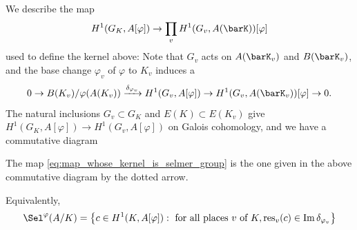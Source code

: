 \begin{definition}
    We describe the map 
    \begin{equation} \label{eq:map_whose_kernel_is_selmer_group}
    H^1(G_K, A[\varphi]) \to \prod_v H^1(G_v, A(\barK))[\varphi]
    \end{equation}
    used to define the kernel above: 
     Note that $G_v$ acts on $A(\barK_v)$ and $B(\barK_v)$, and the base change $\varphi_v$ of $\varphi$ to $K_v$ induces a 
    $$0 \to B(K_v) / \varphi(A(K_v)) \xrightarrow{\delta_{\varphi_v}} H^1(G_v, A[\varphi]) \to H^1(G_v, A(\barK_v))[\varphi] \to 0.$$
    The natural inclusions $G_v \subset G_{K}$ and $E(K) \subset E(K_v)$ give  $H^1(G_K, A[\varphi]) \to H^1(G_v, A[\varphi])$ on Galois cohomology, and we have a commutative diagram
    \begin{center}
    \end{center}
    The map \eqref{eq:map_whose_kernel_is_selmer_group} is the one given in the above commutative diagram by the dotted arrow. 

    Equivalently, 
    $$\Sel^\varphi(A/K) = \left\{c \in H^1(K, A[\varphi]): \text{ for all places } v \text{ of } K, \operatorname{res}_v(c) \in \operatorname{Im} \delta_{\varphi_v} \right \}$$
\end{definition}
